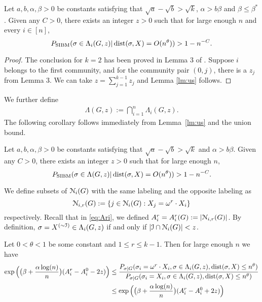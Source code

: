 \documentclass{article}
\begin{document}
\begin{lemma} \label{lm:us}
	Let $a,b,\alpha,\beta> 0$ be constants satisfying that $\sqrt{a}-\sqrt{b} > \sqrt{k}$, $\alpha>b\beta$ and $\beta\le \beta^\ast$.
	Given any $C>0$, there exists an integer $z>0$ such that for large enough $n$ and every $i\in[n]$, 
	\begin{equation} \label{eq:zr}
	P_{\operatorname{SIBM}} (\sigma\in \Lambda_i(G, z)
	| \operatorname{dist}(\sigma, X) = O(n^{\theta}))
	> 1 - n^{-C} .
	\end{equation}
\end{lemma}
\begin{proof}
	The conclusion for $k=2$ has been proved in Lemma 3 of \cite{ye2020exact}. Suppose $i$ belongs to the first community, and for the community
	pair $(0, j)$, there is a $z_{j}$ from Lemma 3.
	We can take $z = \sum_{j=1}^{k-1} z_j$ and Lemma \ref{lm:us} follows.
\end{proof}
We further define 
\begin{align*}
\Lambda(G, z) :=
\bigcap_{i=1}^n
\Lambda_i(G, z) .
\end{align*}
The following corollary follows immediately from Lemma~\ref{lm:us} and the union bound.
\begin{corollary} \label{cr:1}
	Let $a,b,\alpha,\beta> 0$ be constants satisfying that $\sqrt{a}-\sqrt{b} > \sqrt{k}$ and $\alpha>b\beta$.
	Given any $C>0$, there exists an integer $z>0$ such that for large enough $n$, 
	$$
	P_{\operatorname{SIBM}} (\sigma\in \Lambda(G, z)
	|  \operatorname{dist}(\sigma, X) = O(n^{\theta}))
	> 1 - n^{-C} .
	$$
\end{corollary}

We define subsets of $\mathcal{N}_i(G)$ with the same labeling and the opposite labeling as
$$
\mathcal{N}_{i,r}(G):=\{j\in \mathcal{N}_i(G): X_j=\omega^r \cdot X_i \}
$$
respectively.
Recall that in \eqref{eq:Ari}, we defined $A^r_i=A^r_i(G):=|\mathcal{N}_{i,r}(G)|$.
By definition, $\sigma = X^{(\sim\mathcal{I})}\in  \Lambda_i(G,z)$ if and only if $|\mathcal{I}\cap \mathcal{N}_i(G)| < z$.


\begin{lemma} \label{lm:et}
	Let $0<\theta<1$ be some constant and $1\leq r \leq k-1$. Then for large enough $n$ we have
	\begin{align*}
	\exp\Big(\big(\beta+\frac{\alpha\log(n)}{n} \big) (A^r_i-A^0_i - 2z) \Big) & \le 
	\frac{P_{\sigma|G}(\sigma_i= \omega^r \cdot X_i, \sigma\in \Lambda_i(G,z) ,\operatorname{dist}(\sigma, X) \le n^{\theta} ) } 
	{ P_{\sigma|G}(\sigma_i=X_i, \sigma\in \Lambda_i(G,z) ,\operatorname{dist}(\sigma, X) \le n^{\theta} ) } \\
	& \le \exp\Big(\big(\beta+\frac{\alpha\log(n)}{n} \big) (A^r_i-A^0_i + 2z) \Big)
	\end{align*}
\end{lemma}
\end{document}
